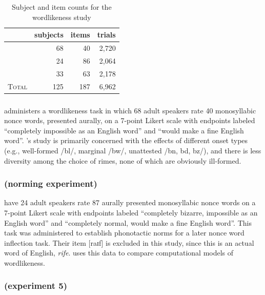 \begin{table}[t]
\centering
\begin{tabular}{l rrr}
\toprule
                           & subjects & items & trials \\
\midrule
\citeauthor{Albright2007}  & 68       & 40    & 2,720  \\
\citeauthor{Albright2003b} & 24       & 86    & 2,064  \\
\citeauthor{Scholes1966}   & 33       & 63    & 2,178  \\
\midrule
\textsc{Total}             & 125      & 187   & 6,962  \\
\bottomrule
\end{tabular}
\caption{Subject and item counts for the wordlikeness study}
\label{counts}
\end{table}

\subsubsection{\citealt{Albright2007}}

\citet{Albright2007} administers a wordlikeness task in which 68 adult speakers rate 40 monosyllabic nonce words, presented aurally, on a 7-point Likert scale with endpoints labeled  ``completely impossible as an English word'' and ``would make a fine English word''. 
\citeauthor{Albright2007}'s study is primarily concerned with the effects of different onset types (e.g., well-formed /bl/, marginal /bw/, unattested /bn, bd, bz/), and there is less diversity among the choice of rimes, none of which are obviously ill-formed.

\subsubsection{\citealt{Albright2003b} (norming experiment)}

\citet{Albright2003b} have 24 adult speakers rate 87 aurally presented monosyllabic nonce words on a 7-point Likert scale with endpoints labeled ``completely bizarre, impossible as an English word'' and ``completely normal, would make a fine English word''.
This task was administered to establish phonotactic norms for a later nonce word inflection task.
Their item [raɪf] is excluded in this study, since this is an actual word of English, \emph{rife}.
\citet{Albright2009a} uses this data to compare computational models of wordlikeness.

\subsubsection{\citealt{Scholes1966} (experiment 5)}

